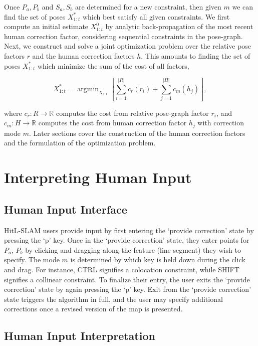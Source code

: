 \documentclass[letterpaper]{article} %
\theoremstyle{definition}
\DeclareMathOperator*{\argmin}{argmin}
\begin{document}
Once $P_a, P_b$ and $S_a, S_b$ are determined for a new constraint, then given $m$ we can find the set of poses $X^* _{1:t}$ which best satisfy all given constraints. We first compute an initial estimate $X^0 _{1:t}$ by analytic back-propagation of the most recent human correction factor, considering sequential constraints in the pose-graph. Next, we construct and solve a joint optimization problem over the relative pose factors $r$ and the human correction factors $h$. This amounts to finding the set of poses $X^*_{1:t}$ which minimize the sum of the cost of all factors,

\begin{equation*}
X^*_{1:t} = \argmin_{X_{1:t}}\left[\sum_{i=1}^{|R|} c_r (r_i)+\sum_{j=1}^{|H|} c_m (h_j)\right],
\end{equation*}

\noindent where $c_r: R \rightarrow \mathbb{R}$ computes the cost from relative pose-graph factor $r_i$, and $c_m: H \rightarrow \mathbb{R}$ computes the cost from human correction factor $h_j$ with correction mode $m$. Later sections cover the construction of the human correction factors and the formulation of the optimization problem.

\section{Interpreting Human Input}

\subsection{Human Input Interface}

HitL-SLAM users provide input by first entering the `provide correction' state by pressing the `p' key. Once in the `provide correction' state, they enter points for $P_a$, $P_b$ by clicking and dragging along the feature (line segment) they wish to specify. The mode $m$ is determined by which key is held down during the click and drag. For instance, CTRL signifies a colocation constraint, while SHIFT signifies a collinear constraint. To finalize their entry, the user exits the `provide correction' state by again pressing the `p' key. Exit from the `provide correction' state triggers the algorithm in full, and the user may specify additional corrections once a revised version of the map is presented.

\subsection{Human Input Interpretation}
\end{document}
